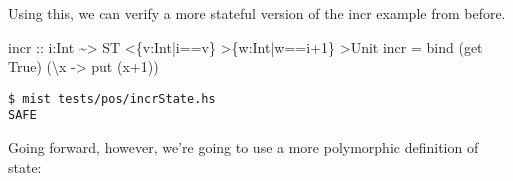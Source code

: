 \documentclass[
]{darts-v2021}
\newenvironment{Shaded}{}{}
\newcommand{\DataTypeTok}[1]{\textcolor[rgb]{0.56,0.13,0.00}{#1}}
\newcommand{\DecValTok}[1]{\textcolor[rgb]{0.25,0.63,0.44}{#1}}
\newcommand{\NormalTok}[1]{#1}
\newcommand{\OperatorTok}[1]{\textcolor[rgb]{0.40,0.40,0.40}{#1}}
\newcommand{\OtherTok}[1]{\textcolor[rgb]{0.00,0.44,0.13}{#1}}
\begin{document}
Using this, we can verify a more stateful version of the incr example
from before.

\begin{Shaded}
\begin{Highlighting}[numbers=left,,firstnumber=24,]
\OtherTok{incr ::}\NormalTok{ i}\OperatorTok{:}\DataTypeTok{Int} \OperatorTok{\textasciitilde{}\textgreater{}} \DataTypeTok{ST} \OperatorTok{\textless{}}\NormalTok{\{v}\OperatorTok{:}\DataTypeTok{Int}\OperatorTok{|}\NormalTok{i}\OperatorTok{==}\NormalTok{v\} }\OperatorTok{\textgreater{}}\NormalTok{\{w}\OperatorTok{:}\DataTypeTok{Int}\OperatorTok{|}\NormalTok{w}\OperatorTok{==}\NormalTok{i}\OperatorTok{+}\DecValTok{1}\NormalTok{\} }\OperatorTok{\textgreater{}}\DataTypeTok{Unit}
\NormalTok{incr }\OtherTok{=}\NormalTok{ bind (get }\DataTypeTok{True}\NormalTok{) (\textbackslash{}x }\OtherTok{{-}\textgreater{}}\NormalTok{ put (x}\OperatorTok{+}\DecValTok{1}\NormalTok{))}
\end{Highlighting}
\end{Shaded}

\begin{verbatim}
$ mist tests/pos/incrState.hs
SAFE
\end{verbatim}

Going forward, however, we're going to use a more polymorphic definition
of state:
\end{document}
